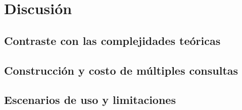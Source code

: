 \section{Discusión}
\subsection{Contraste con las complejidades teóricas}
\subsection{Construcción y costo de múltiples consultas}
\subsection{Escenarios de uso y limitaciones}
